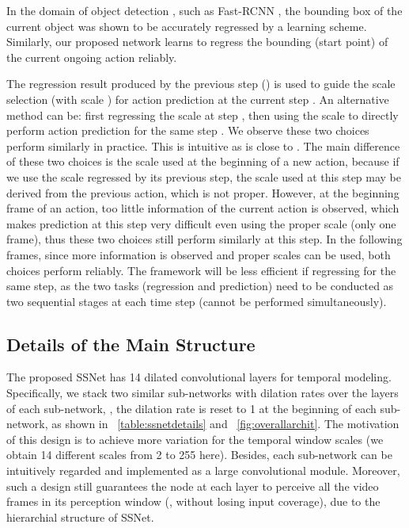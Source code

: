 \documentclass[10pt,twocolumn,letterpaper]{article}
\begin{document}
In the domain of object detection \cite{lin2017feature}, such as Fast-RCNN \cite{girshick2015fast}, the bounding box of the current object was shown to be accurately regressed by a learning scheme.
Similarly, our proposed network learns to regress the bounding (start point) of the current ongoing action reliably.

The regression result produced by the previous step () is used to guide the scale selection (with scale )
for action prediction at the current step .
An alternative method can be: first regressing the scale  at step ,
then using the scale  to directly perform action prediction for the same step .
We observe these two choices perform similarly in practice.
This is intuitive as  is close to .
The main difference of these two choices is the scale used at the beginning of a new action,
because if we use the scale regressed by its previous step, the scale used at this step may be derived from the previous action, which is not proper.
However, at the beginning frame of an action, too little information of the current action is observed,
which makes prediction at this step very difficult even using the proper scale (only one frame),
thus these two choices still perform similarly at this step.
In the following frames, since more information is observed and proper scales can be used, both choices perform reliably.
The framework will be less efficient if regressing for the same step,
as the two tasks (regression and prediction) need to be conducted as two sequential stages at each time step (cannot be performed simultaneously).





























\subsection{Details of the Main Structure}

The proposed SSNet has 14 dilated convolutional layers for temporal modeling.
Specifically, we stack two similar sub-networks with dilation rates  {} over the layers of each sub-network,
\ie, the dilation rate  is reset to 1 at the beginning of each sub-network, as shown in \tablename{~\ref{table:ssnetdetails}} and \figurename{~\ref{fig:overallarchit}}.
The motivation of this design is to achieve more variation for the temporal window scales (we obtain 14 different scales from 2 to 255 here).
Besides, each sub-network can be intuitively regarded and implemented as a large convolutional module.
Moreover, such a design still guarantees the node at each layer to perceive all the video frames in its perception window (\ie, without losing input coverage),
due to the hierarchial structure of SSNet.
\end{document}
